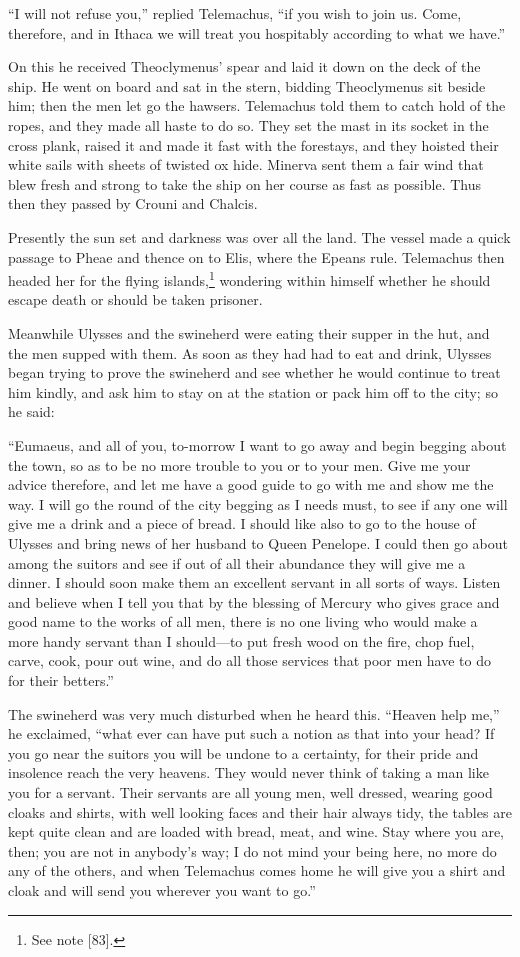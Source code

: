 “I will not refuse you,” replied Telemachus, “if you wish to join us. Come,
therefore, and in Ithaca we will treat you hospitably according to what we
have.”

On this he received Theoclymenus’ spear and laid it down on the deck of the
ship. He went on board and sat in the stern, bidding Theoclymenus sit beside
him; then the men let go the hawsers. Telemachus told them to catch hold of the
ropes, and they made all haste to do so. They set the mast in its socket in the
cross plank, raised it and made it fast with the forestays, and they hoisted
their white sails with sheets of twisted ox hide. Minerva sent them a fair wind
that blew fresh and strong to take the ship on her course as fast as possible.
Thus then they passed by Crouni and Chalcis.

Presently the sun set and darkness was over all the land. The vessel made a
quick passage to Pheae and thence on to Elis, where the Epeans rule. Telemachus
then headed her for the flying islands,\footnote{See note [83].} wondering within himself whether he
should escape death or should be taken prisoner.

Meanwhile Ulysses and the swineherd were eating their supper in the hut, and
the men supped with them. As soon as they had had to eat and drink, Ulysses
began trying to prove the swineherd and see whether he would continue to treat
him kindly, and ask him to stay on at the station or pack him off to the city;
so he said:

“Eumaeus, and all of you, to-morrow I want to go away and begin begging about
the town, so as to be no more trouble to you or to your men. Give me your
advice therefore, and let me have a good guide to go with me and show me the
way. I will go the round of the city begging as I needs must, to see if any one
will give me a drink and a piece of bread. I should like also to go to the
house of Ulysses and bring news of her husband to Queen Penelope. I could then
go about among the suitors and see if out of all their abundance they will give
me a dinner. I should soon make them an excellent servant in all sorts of ways.
Listen and believe when I tell you that by the blessing of Mercury who gives
grace and good name to the works of all men, there is no one living who would
make a more handy servant than I should—to put fresh wood on the fire, chop
fuel, carve, cook, pour out wine, and do all those services that poor men have
to do for their betters.”

The swineherd was very much disturbed when he heard this. “Heaven help me,” he
exclaimed, “what ever can have put such a notion as that into your head? If you
go near the suitors you will be undone to a certainty, for their pride and
insolence reach the very heavens. They would never think of taking a man like
you for a servant. Their servants are all young men, well dressed, wearing good
cloaks and shirts, with well looking faces and their hair always tidy, the
tables are kept quite clean and are loaded with bread, meat, and wine. Stay
where you are, then; you are not in anybody’s way; I do not mind your being
here, no more do any of the others, and when Telemachus comes home he will give
you a shirt and cloak and will send you wherever you want to go.”

